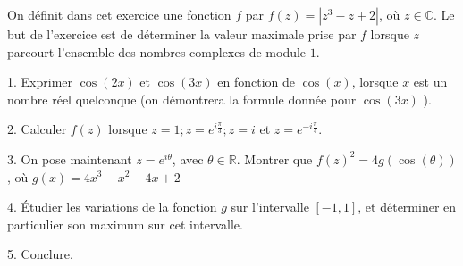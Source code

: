 \documentclass[a4paper, 11pt,reqno]{article}
\begin{document}
\begin{exercice}

On définit dans cet exercice une fonction $f$ par $f(z)=\left|z^{3}-z+2\right|$, où $z \in \mathbb{C} .$ Le but de l'exercice est de déterminer la valeur maximale prise par $f$ lorsque $z$ parcourt l'ensemble des nombres complexes de module $1 .$

1. Exprimer $\cos (2 x)$ et $\cos (3 x)$ en fonction de $\cos (x)$, lorsque $x$ est un nombre réel quelconque (on démontrera la formule donnée pour $\cos (3 x)$ ).

2. Calculer $f(z)$ lorsque $z=1 ; z=e^{i \frac{\pi}{3}} ; z=i$ et $z=e^{-i \frac{\pi}{4}}$.

3. On pose maintenant $z=e^{i \theta}$, avec $\theta \in \mathbb{R}$. Montrer que $f(z)^{2}=4 g(\cos (\theta))$, où $g(x)=4 x^{3}-x^{2}-4 x+2$

4. Étudier les variations de la fonction $g$ sur l'intervalle $[-1,1]$, et déterminer en particulier son maximum sur cet intervalle.

5. Conclure.
\end{exercice}
\end{document}
